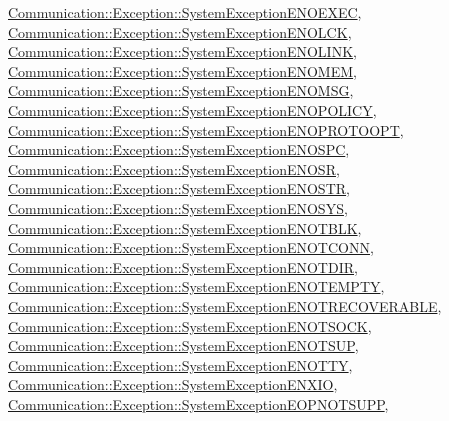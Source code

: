 \hyperlink{class_communication_1_1_exception_1_1_system_exception_e_n_o_e_x_e_c}{Communication\+::\+Exception\+::\+System\+Exception\+E\+N\+O\+E\+X\+E\+C}, \hyperlink{class_communication_1_1_exception_1_1_system_exception_e_n_o_l_c_k}{Communication\+::\+Exception\+::\+System\+Exception\+E\+N\+O\+L\+C\+K}, \hyperlink{class_communication_1_1_exception_1_1_system_exception_e_n_o_l_i_n_k}{Communication\+::\+Exception\+::\+System\+Exception\+E\+N\+O\+L\+I\+N\+K}, \hyperlink{class_communication_1_1_exception_1_1_system_exception_e_n_o_m_e_m}{Communication\+::\+Exception\+::\+System\+Exception\+E\+N\+O\+M\+E\+M}, \hyperlink{class_communication_1_1_exception_1_1_system_exception_e_n_o_m_s_g}{Communication\+::\+Exception\+::\+System\+Exception\+E\+N\+O\+M\+S\+G}, \hyperlink{class_communication_1_1_exception_1_1_system_exception_e_n_o_p_o_l_i_c_y}{Communication\+::\+Exception\+::\+System\+Exception\+E\+N\+O\+P\+O\+L\+I\+C\+Y}, \hyperlink{class_communication_1_1_exception_1_1_system_exception_e_n_o_p_r_o_t_o_o_p_t}{Communication\+::\+Exception\+::\+System\+Exception\+E\+N\+O\+P\+R\+O\+T\+O\+O\+P\+T}, \hyperlink{class_communication_1_1_exception_1_1_system_exception_e_n_o_s_p_c}{Communication\+::\+Exception\+::\+System\+Exception\+E\+N\+O\+S\+P\+C}, \hyperlink{class_communication_1_1_exception_1_1_system_exception_e_n_o_s_r}{Communication\+::\+Exception\+::\+System\+Exception\+E\+N\+O\+S\+R}, \hyperlink{class_communication_1_1_exception_1_1_system_exception_e_n_o_s_t_r}{Communication\+::\+Exception\+::\+System\+Exception\+E\+N\+O\+S\+T\+R}, \hyperlink{class_communication_1_1_exception_1_1_system_exception_e_n_o_s_y_s}{Communication\+::\+Exception\+::\+System\+Exception\+E\+N\+O\+S\+Y\+S}, \hyperlink{class_communication_1_1_exception_1_1_system_exception_e_n_o_t_b_l_k}{Communication\+::\+Exception\+::\+System\+Exception\+E\+N\+O\+T\+B\+L\+K}, \hyperlink{class_communication_1_1_exception_1_1_system_exception_e_n_o_t_c_o_n_n}{Communication\+::\+Exception\+::\+System\+Exception\+E\+N\+O\+T\+C\+O\+N\+N}, \hyperlink{class_communication_1_1_exception_1_1_system_exception_e_n_o_t_d_i_r}{Communication\+::\+Exception\+::\+System\+Exception\+E\+N\+O\+T\+D\+I\+R}, \hyperlink{class_communication_1_1_exception_1_1_system_exception_e_n_o_t_e_m_p_t_y}{Communication\+::\+Exception\+::\+System\+Exception\+E\+N\+O\+T\+E\+M\+P\+T\+Y}, \hyperlink{class_communication_1_1_exception_1_1_system_exception_e_n_o_t_r_e_c_o_v_e_r_a_b_l_e}{Communication\+::\+Exception\+::\+System\+Exception\+E\+N\+O\+T\+R\+E\+C\+O\+V\+E\+R\+A\+B\+L\+E}, \hyperlink{class_communication_1_1_exception_1_1_system_exception_e_n_o_t_s_o_c_k}{Communication\+::\+Exception\+::\+System\+Exception\+E\+N\+O\+T\+S\+O\+C\+K}, \hyperlink{class_communication_1_1_exception_1_1_system_exception_e_n_o_t_s_u_p}{Communication\+::\+Exception\+::\+System\+Exception\+E\+N\+O\+T\+S\+U\+P}, \hyperlink{class_communication_1_1_exception_1_1_system_exception_e_n_o_t_t_y}{Communication\+::\+Exception\+::\+System\+Exception\+E\+N\+O\+T\+T\+Y}, \hyperlink{class_communication_1_1_exception_1_1_system_exception_e_n_x_i_o}{Communication\+::\+Exception\+::\+System\+Exception\+E\+N\+X\+I\+O}, \hyperlink{class_communication_1_1_exception_1_1_system_exception_e_o_p_n_o_t_s_u_p_p}{Communication\+::\+Exception\+::\+System\+Exception\+E\+O\+P\+N\+O\+T\+S\+U\+P\+P}, 